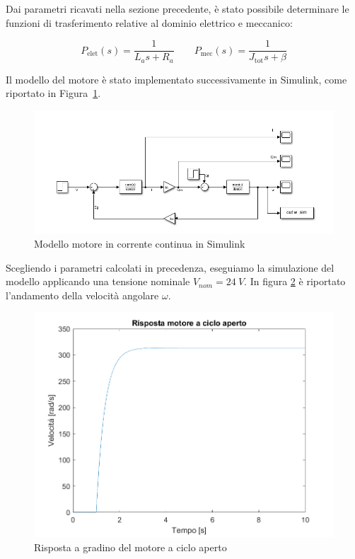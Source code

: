\documentclass[a4paper,12pt]{article}
\begin{document}
\vspace{0.3cm}

Dai parametri ricavati nella sezione precedente, è stato possibile determinare le funzioni di trasferimento relative al dominio elettrico e meccanico:

\vspace{0.5cm}

$$
P_{\text{elet}}(s) = \frac{1}{L_a s + R_a} \quad\quad
P_{\text{mec}}(s) = \frac{1}{J_{\text{tot}} s + \beta}
$$

\vspace{0.5cm}

Il modello del motore è stato implementato successivamente in Simulink, come riportato in Figura~\ref{fig:modello_simulink}.


\begin{figure}[h!]
\centering
    \includegraphics[scale=0.6]{Immagini/Altre/motoreSimulink.PNG} 
    \caption{Modello motore in corrente continua in Simulink}
    \label{fig:modello_simulink}
\end{figure}
\vspace{0.5cm}

Scegliendo i parametri calcolati in precedenza, eseguiamo la simulazione del modello applicando una tensione nominale $V_{nom}=24~V$. In figura \ref{fig: ciclo aperto} è riportato l'andamento della velocità angolare $\omega$.

\vspace{0.3cm}

\begin{figure}[h!]
\centering
    \includegraphics[scale=0.6]{Immagini/PlotMatlab/rispostaMotoreCicloAperto.png} 
    \caption{Risposta a gradino del motore a ciclo aperto}
    \label{fig: ciclo aperto}
\end{figure}
\end{document}
